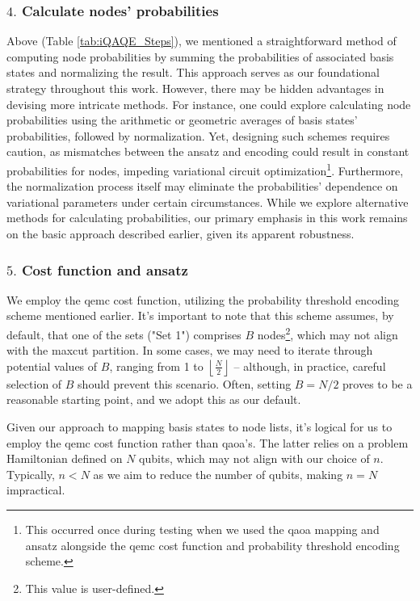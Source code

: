 \subsubsection*{$4.$ Calculate nodes' probabilities}
Above (Table \ref{tab:iQAQE_Steps}), we mentioned a straightforward method of computing node probabilities by summing the probabilities of associated basis states and normalizing the result. This approach serves as our foundational strategy throughout this work. However, there may be hidden advantages in devising more intricate methods. For instance, one could explore calculating node probabilities using the arithmetic or geometric averages of basis states' probabilities, followed by normalization. Yet, designing such schemes requires caution, as mismatches between the ansatz and encoding could result in constant probabilities for nodes, impeding variational circuit optimization\footnote{This occurred once during testing when we used the \acrshort{qaoa} mapping and ansatz alongside the \acrshort{qemc} cost function and probability threshold encoding scheme.}. Furthermore, the normalization process itself may eliminate the probabilities' dependence on variational parameters under certain circumstances. While we explore alternative methods for calculating probabilities, our primary emphasis in this work remains on the basic approach described earlier, given its apparent robustness.

\subsubsection*{$5.$ Cost function and ansatz}
We employ the \acrshort{qemc} cost function, utilizing the probability threshold encoding scheme mentioned earlier. It's important to note that this scheme assumes, by default, that one of the sets ("Set 1") comprises $B$ nodes\footnote{This value is user-defined.}, which may not align with the \acrshort{maxcut} partition. In some cases, we may need to iterate through potential values of $B$, ranging from 1 to $\left\lfloor{\frac{N}{2}}\right\rfloor$ – although, in practice, careful selection of $B$ should prevent this scenario. Often, setting $B = N/2$ proves to be a reasonable starting point, and we adopt this as our default.

Given our approach to mapping basis states to node lists, it's logical for us to employ the \acrshort{qemc} cost function rather than \acrshort{qaoa}'s. The latter relies on a problem Hamiltonian defined on $N$ qubits, which may not align with our choice of $n$. Typically, $n < N$ as we aim to reduce the number of qubits, making $n = N$ impractical.


